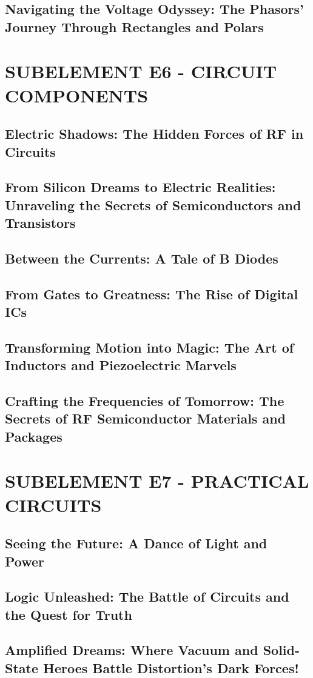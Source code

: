\documentclass[12pt]{book}
\begin{document}
\section{Navigating the Voltage Odyssey: The Phasors' Journey Through Rectangles and Polars}
\chapter{SUBELEMENT E6 - CIRCUIT COMPONENTS}
\section{Electric Shadows: The Hidden Forces of RF in Circuits}
\section{From Silicon Dreams to Electric Realities: Unraveling the Secrets of Semiconductors and Transistors}
\section{Between the Currents: A Tale of B Diodes}
\section{From Gates to Greatness: The Rise of Digital ICs}
\section{Transforming Motion into Magic: The Art of Inductors and Piezoelectric Marvels}
\section{Crafting the Frequencies of Tomorrow: The Secrets of RF Semiconductor Materials and Packages}
\chapter{SUBELEMENT E7 - PRACTICAL CIRCUITS}
\section{Seeing the Future: A Dance of Light and Power}
\section{Logic Unleashed: The Battle of Circuits and the Quest for Truth}
\section{Amplified Dreams: Where Vacuum and Solid-State Heroes Battle Distortion's Dark Forces!}
\end{document}
